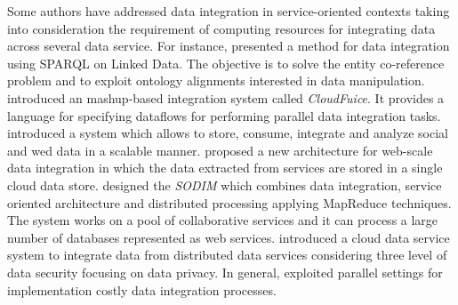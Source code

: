 Some authors have addressed data integration in service-oriented contexts
taking into consideration the requirement of computing resources for integrating data
across several data service.
%
For instance, \cite{Correndo2010} presented a method for data integration using SPARQL
on Linked Data. The objective is to solve the entity co-reference problem 
and to exploit ontology alignments interested in data manipulation. 
%
\cite{Thor:2011} introduced an mashup-based integration system called \textit{CloudFuice}.
It provides a language for specifying dataflows for performing parallel data integration
tasks.	
%
\cite{Alsubaiee:2012} introduced a system which allows to store, consume, integrate and
analyze social and wed data in a scalable manner.
\cite{Mubeen2012} proposed a new architecture for web-scale data integration in which
the data extracted from services are stored in a single cloud data store.
%
\cite{ElSheikh2013} designed the \textit{SODIM} which combines data integration,
service oriented architecture and distributed processing applying MapReduce techniques. 
The system works on a pool of collaborative services and it can process a large number 
of databases represented as web services. 
\cite{Hong2014} introduced a cloud data service system to integrate data from distributed
data services considering three level of data security focusing on data privacy.
In general, \cite{Correndo2010,Thor:2011,Alsubaiee:2012,Mubeen2012,ElSheikh2013,Hong2014}
exploited parallel settings for implementation costly data integration processes.

